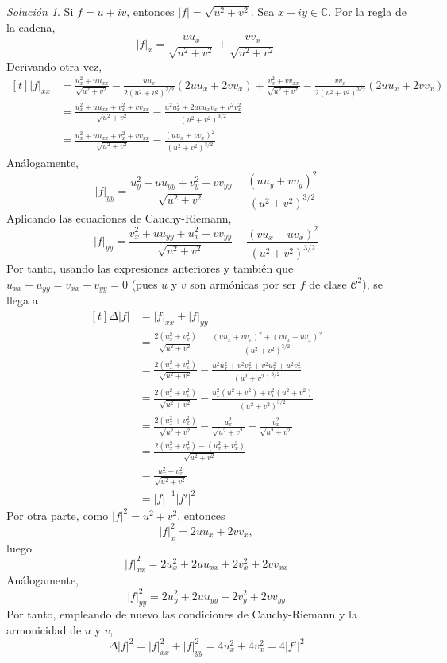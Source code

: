 \documentclass[11pt]{report}
\newcommand{\C}{\mathbb C}
\theoremstyle{remark}
\newtheorem*{resolution}{Solución}
\begin{document}
\begin{resolution}
Si $f = u+iv$, entonces $|f| = \sqrt{u^2+v^2}$. Sea $x+iy \in \C$. Por la regla de la cadena,
\[|f|_x = \frac{uu_x}{\sqrt{u^2+v^2}}+\frac{vv_x}{\sqrt{u^2+v^2}}\]
Derivando otra vez,
\[
\begin{aligned}[t]
|f|_{xx} &= \frac{u_x^2+uu_{xx}}{\sqrt{u^2+v^2}}-\frac{uu_x}{2(u^2+v^2)^{3/2}}(2uu_x+2vv_x)+ \frac{v_x^2+vv_{xx}}{\sqrt{u^2+v^2}}-\frac{vv_x}{2(u^2+v^2)^{3/2}}(2uu_x+2vv_x) \\
&= \frac{u_x^2+uu_{xx}+v_x^2+vv_{xx}}{\sqrt{u^2+v^2}}-\frac{u^2u_x^2+2uvu_xv_x+v^2v_x^2}{(u^2+v^2)^{3/2}} \\
&= \frac{u_x^2+uu_{xx}+v_x^2+vv_{xx}}{\sqrt{u^2+v^2}}-\frac{(uu_x+vv_x)^2}{(u^2+v^2)^{3/2}}
\end{aligned}
\]
Análogamente,
\[|f|_{yy} = \frac{u_y^2+uu_{yy}+v_y^2+vv_{yy}}{\sqrt{u^2+v^2}}-\frac{(uu_y+vv_y)^2}{(u^2+v^2)^{3/2}}\]
Aplicando las ecuaciones de Cauchy-Riemann,
\[|f|_{yy} = \frac{v_x^2+uu_{yy}+u_x^2+vv_{yy}}{\sqrt{u^2+v^2}}-\frac{(vu_x-uv_x)^2}{(u^2+v^2)^{3/2}}\]
Por tanto, usando las expresiones anteriores y también que $u_{xx}+u_{yy} = v_{xx}+v_{yy} = 0$ (pues $u$ y $v$ son armónicas por ser $f$ de clase $\mathcal{C}^2$), se llega a
\[\begin{aligned}[t]
\Delta|f| &= |f|_{xx}+|f|_{yy} \\
&= \frac{2(u_x^2+v_x^2)}{\sqrt{u^2+v^2}}-\frac{(uu_x+vv_x)^2+(vu_x-uv_x)^2}{(u^2+v^2)^{3/2}} \\
&= \frac{2(u_x^2+v_x^2)}{\sqrt{u^2+v^2}}-\frac{u^2u_x^2+v^2v_x^2+v^2u_x^2+u^2v_x^2}{(u^2+v^2)^{3/2}} \\
&= \frac{2(u_x^2+v_x^2)}{\sqrt{u^2+v^2}}-\frac{u_x^2(u^2+v^2)+v_x^2(u^2+v^2)}{(u^2+v^2)^{3/2}} \\
&= \frac{2(u_x^2+v_x^2)}{\sqrt{u^2+v^2}}-\frac{u_x^2}{\sqrt{u^2+v^2}} -\frac{v_x^2}{\sqrt{u^2+v^2}} \\
&= \frac{2(u_x^2+v_x^2)-(u_x^2+v_x^2)}{\sqrt{u^2+v^2}} \\
&= \frac{u_x^2+v_x^2}{\sqrt{u^2+v^2}} \\
&= |f|^{-1}|f'|^2
\end{aligned}\]
Por otra parte, como $|f|^2 = u^2+v^2$, entonces
\[|f|^2_x = 2uu_x+2vv_x,\]
luego
\[|f|^2_{xx} = 2u_x^2+2uu_{xx}+2v_x^2+2vv_{xx}\]
Análogamente,
\[|f|^2_{yy} = 2u_y^2+2uu_{yy}+2v_y^2+2vv_{yy}\]
Por tanto, empleando de nuevo las condiciones de Cauchy-Riemann y la armonicidad de $u$ y $v$,
\[\Delta |f|^2 = |f|^2_{xx}+|f|^2_{yy} = 4u_x^2+4v_x^2 = 4|f'|^2\]
\end{resolution}
\end{document}
